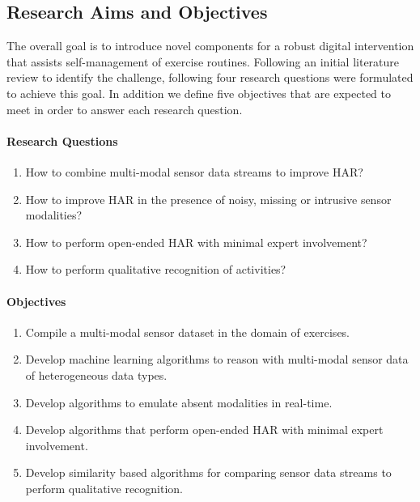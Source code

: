\documentclass[runningheads]{llncs}
\begin{document}
\subsection{Research Aims and Objectives}
The overall goal is to introduce novel components for a robust digital intervention that assists self-management of exercise routines. Following an initial literature review to identify the challenge, following four research questions were formulated to achieve this goal. In addition we define five objectives that are expected to meet in order to answer each research question.

\paragraph{Research Questions}
\label{sec:rq}
\begin{enumerate}
\item How to combine multi-modal sensor data streams to improve HAR?
\item How to improve HAR in the presence of noisy, missing or intrusive sensor modalities?
\item How to perform open-ended HAR with minimal expert involvement?
\item How to perform qualitative recognition of activities?
\end{enumerate}

\paragraph{Objectives}
\begin{enumerate}
\item Compile a multi-modal sensor dataset in the domain of exercises.
\item Develop machine learning algorithms to reason with multi-modal sensor data of heterogeneous data types. 
\item Develop algorithms to emulate absent modalities in real-time.
\item Develop algorithms that perform open-ended HAR with minimal expert involvement. 
\item Develop similarity based algorithms for comparing sensor data streams to perform qualitative recognition.
\end{enumerate}
\end{document}
